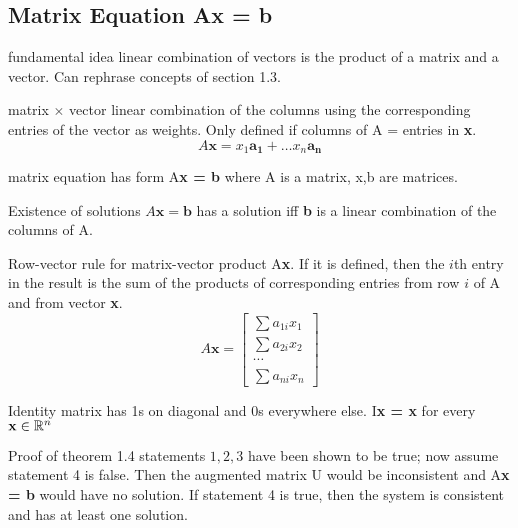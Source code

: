 \begin{card}
    \subsection{Matrix Equation Ax = b}

    \begin{compactdesc}
    \item[fundamental idea] linear combination of vectors is the product of a
        matrix and a vector. Can rephrase concepts of section 1.3.
    \item[matrix $\times$ vector] linear combination of the columns using the
        corresponding entries of the vector as weights. Only defined if
        columns of A = entries in \textbf{x}.
        \[
            A\bm{x} = x_1 \bm{a_1} + \dots x_n \bm{a_n}
        \]
    \item[matrix equation] has form A\textbf{x = b} where A is a matrix, x,b
        are matrices.
    \item[Existence of solutions] $A\bm{x = b}$ has a solution iff \textbf{b}
        is a linear combination of the columns of A.
    \item[Row-vector rule] for matrix-vector product A\textbf{x}. If it is
        defined, then the $i$th entry in the result is the sum of the
        products of corresponding entries from row $i$ of A and
        from vector \textbf{x}.
        \[
            A\bm{x} = \left[ \begin{array}{c}
            \sum a_{1i} x_1
            \\
            \sum a_{2i} x_2
            \\
            \cdots
            \\
            \sum a_{ni} x_n
            \end{array} \right]
        \]
    \item[Identity matrix] has 1s on diagonal and 0s everywhere else.
        I\textbf{x = x} for every $\mathbf{x} \in \mathbb{R}^n$
    \item[Proof of theorem 1.4] statements $1,2,3$ have been shown to be true;
        now assume statement 4 is false. Then the augmented matrix U would
        be inconsistent and A\textbf{x = b} would have no solution.
        If statement 4 is true, then the system is consistent and has
        at least one solution.

    \end{compactdesc}

\end{card}

